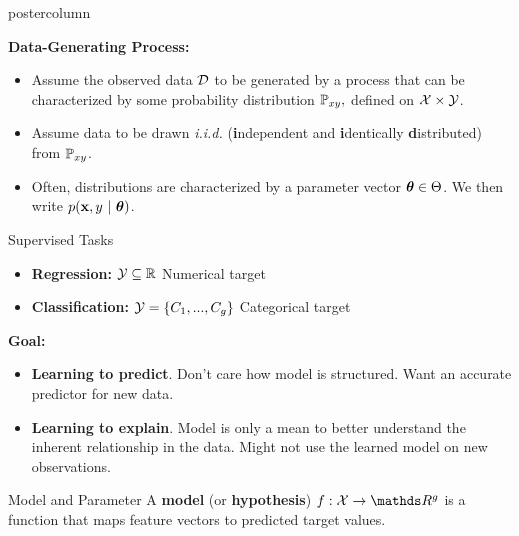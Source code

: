 \documentclass{beamer}
\begin{document}
\begin{frame}[fragile]{}
\begin{columns}
\begin{column}{.31\textwidth}
\begin{beamercolorbox}[center]{postercolumn}
\begin{minipage}{.98\textwidth}
{\begin{myblock}{ }
\begin{codebox}
  \textbf{Data-Generating Process: }
  \end{codebox}
  \begin{itemize}[$\bullet$] 
    \setlength{\itemindent}{+.3in}
    \item Assume the observed data $\mathcal{D}$ to be generated by a process that can
    be characterized by some probability distribution $\mathbb{P}_{xy},$ defined on 
    $\mathcal{X} \times \mathcal{Y}$.
    \item Assume data to be drawn \emph{i.i.d.} (\textbf{i}ndependent and \textbf{i}dentically 
      \textbf{d}istributed) from $\mathbb{P}_{xy}$. 
    \item Often, distributions are characterized by a parameter vector 
      $\bm{\theta} \in \Theta$. We then write $p(\mathbf{x}, y ~|~ \bm{\theta})$.
    \end{itemize} 
  \end{myblock}

  \begin{myblock}{Supervised Tasks}

      \begin{itemize}[$\bullet$] 
      \setlength{\itemindent}{+.3in}
                  \item \textbf{Regression:} $\mathcal{Y} \subseteq \mathbb{R}$ Numerical target
                  \item \textbf{Classification:} $\mathcal{Y} = \{C_1,...,C_g\}$ Categorical target
                 \end{itemize}


  \begin{codebox}
  \textbf{Goal:}
  \end{codebox}
  \begin{itemize}[$\bullet$] 
  \setlength{\itemindent}{+.3in}
  \item \textbf{Learning to predict}. Don't care how
        model is structured. Want an accurate predictor for new data.

    \item \textbf{Learning to explain}. Model is only a mean to 
        better understand the inherent relationship in the data.
        Might not use the learned model on new observations.
\end{itemize}

  \end{myblock}

  \begin{myblock}{Model and Parameter}
    A \textbf{model} (or \textbf{hypothesis}) 
    $f : \Xspace \rightarrow \R^g$
    is a function that maps feature vectors to predicted target values.
  

\end{myblock}}
\end{minipage}
\end{beamercolorbox}
\end{column}
\end{columns}
\end{frame}
\end{document}
